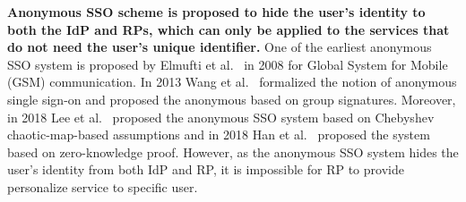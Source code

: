

\textbf{Anonymous SSO scheme is proposed to hide the user's identity to both the IdP and RPs, which can only be applied to the services that do not need the user's unique identifier.}
One of the earliest anonymous SSO system is proposed by Elmufti et al.~\cite{ElmuftiWRR08} in 2008 for Global System for Mobile (GSM) communication. In 2013 Wang et al.~\cite{WangWS13} formalized the notion of anonymous single sign-on and proposed the anonymous based on group signatures. Moreover, in 2018 Lee et al.~\cite{Lee18} proposed the anonymous SSO system  based on Chebyshev chaotic-map-based assumptions and in 2018 Han et al.~\cite{HanCSTW18} proposed the system based on zero-knowledge proof. However, as the anonymous SSO system hides the user's identity from both IdP and RP, it is impossible for RP to provide personalize service to specific user.

